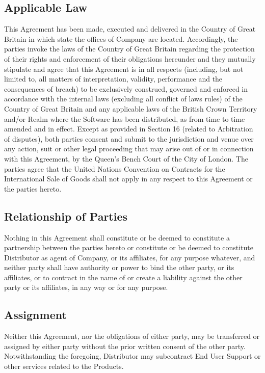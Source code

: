\documentclass[letterpaper,10pt,openany,oneside,english]{sphinxmanual}
\begin{document}
\subsection{Applicable Law}
\label{\detokenize{miscellaneous:applicable-law}}
This Agreement has been made, executed and delivered in the
Country of Great Britain in which state the offices of Company are located. Accordingly, the parties invoke the laws of the Country of Great Britain regarding the protection of their rights and enforcement of their obligations hereunder and they mutually stipulate and agree that this Agreement is in all respects (including, but not limited to, all matters of interpretation, validity, performance and the consequences of breach) to be exclusively construed, governed and enforced in accordance with the internal laws (excluding all conflict of laws rules) of the Country of Great Britain and any applicable laws of the British Crown Territory and/or Realm where the Software has been distributed, as from time to time amended and in effect. Except as provided in Section 16 (related to Arbitration of disputes), both parties consent and submit to the jurisdiction and venue over any action, suit or other legal proceeding that may arise out of or in connection with this Agreement, by the Queen’s Bench Court of the City of London. The parties agree that the United Nations Convention on Contracts for the International Sale of Goods shall not apply in any respect to this Agreement or the parties hereto.


\subsection{Relationship of Parties}
\label{\detokenize{miscellaneous:relationship-of-parties}}
Nothing in this Agreement shall constitute or be deemed to constitute a partnership between the parties hereto or constitute or be deemed to constitute Distributor as agent of Company, or its affiliates, for any purpose whatever, and neither party shall have  authority or power to bind the other party, or its affiliates, or to contract in the name of or create a liability against the other party or its affiliates, in any way or for any purpose.


\subsection{Assignment}
\label{\detokenize{miscellaneous:assignment}}
Neither this Agreement, nor the obligations of either party, may be transferred or assigned by either party without the prior written consent of the other party.  Notwithstanding the foregoing, Distributor may subcontract End User Support or other services related to the Products.
\end{document}
